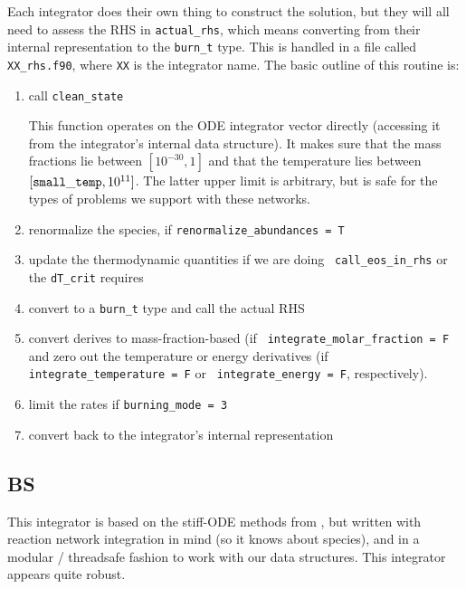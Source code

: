 Each integrator does their own thing to construct the solution, 
but they will all need to assess the RHS in {\tt actual\_rhs},
which means converting from their internal representation
to the {\tt burn\_t} type.  This is handled in a file
called {\tt XX\_rhs.f90}, where {\tt XX} is the integrator name.
The basic outline of this routine is:
\begin{enumerate}
\item call {\tt clean\_state}

This function operates on the ODE integrator vector directly
(accessing it from the integrator's internal data structure).  It
makes sure that the mass fractions lie between $[10^{-30}, 1]$ and
that the temperature lies between $[{\tt small\_temp}, 10^{11}]$.  The
latter upper limit is arbitrary, but is safe for the types of problems
we support with these networks.


\item renormalize the species, if {\tt renormalize\_abundances = T}

\item update the thermodynamic quantities if we are doing {\tt
  call\_eos\_in\_rhs} or the {\tt dT\_crit} requires

\item convert to a {\tt burn\_t} type and call the actual RHS

\item convert derives to mass-fraction-based (if {\tt
  integrate\_molar\_fraction = F} and zero out the temperature or
  energy derivatives (if {\tt integrate\_temperature = F} or {\tt
    integrate\_energy = F}, respectively).

\item limit the rates if {\tt burning\_mode = 3}

\item convert back to the integrator's internal representation
\end{enumerate}


\subsection{BS}
\label{sec:BS}

This integrator is based on the stiff-ODE methods from \cite{NR}, but
written with reaction network integration in mind (so it knows about
species), and in a modular / threadsafe fashion to work with our data
structures.  This integrator appears quite robust.


